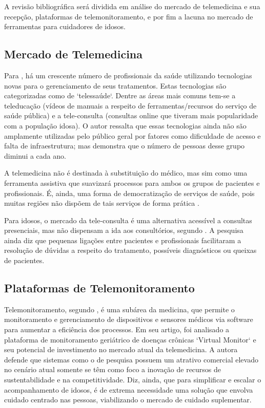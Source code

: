 \documentclass[
	article,			%
	12pt,				%
	oneside,			%
	a4paper,			%
    BIBLATEX,           %
	english,			%
	brazil,				%
	sumario=tradicional
	]{abntex2}
\begin{document}
A revisão bibliográfica será dividida em análise do mercado de telemedicina e sua recepção, plataformas de telemonitoramento, e por fim a lacuna no mercado de ferramentas para cuidadores de idosos.

\subsection{Mercado de Telemedicina}

Para , há um crescente número de profissionais da saúde utilizando tecnologias novas para o gerenciamento de seus tratamentos. Estas tecnologias são categorizadas como de `telessaúde`. Dentre as áreas mais comuns tem-se a teleducação (vídeos de manuais a respeito de ferramentas/recursos do serviço de saúde pública) e a tele-consulta (consultas online que tiveram mais popularidade com a população idosa). O autor ressalta que essas tecnologias ainda não são amplamente utilizadas pelo público geral por fatores como dificuldade de acesso e falta de infraestrutura; mas demonstra que o número de pessoas desse grupo diminui a cada ano.

A telemedicina não é destinada à substituição do médico, mas sim como uma ferramenta assistiva que suavizará processos para ambos os grupos de pacientes e profissionais. É, ainda, 
uma forma de democratização de serviços de saúde, pois muitas regiões não dispõem de tais serviços de forma prática \cite{Schaefer2023telemedicina}.

Para idosos, o mercado da tele-consulta é uma alternativa acessível a consultas presenciais, mas não dispensam a ida aos consultórios, segundo . A pesquisa ainda diz que pequenas ligações entre pacientes e profissionais facilitaram a resolução de dúvidas a respeito do tratamento, possíveis diagnósticos ou queixas de pacientes.

\subsection{Plataformas de Telemonitoramento}

Telemonitoramento, segundo , é uma subárea da medicina, que permite o monitoramento e gerenciamento de dispositivos e sensores médicos via software para aumentar a eficiência dos processos. Em seu artigo, foi analisado a plataforma de monitoramento geriátrico de doenças crônicas `Virtual Monitor` e seu potencial de investimento no mercado atual da telemedicina. A autora defende que sistemas como o de pesquisa possuem um atrativo comercial elevado no cenário atual somente se têm como foco a inovação de recursos de sustentabilidade e na competitividade. Diz, ainda, que para simplificar e escalar o acompanhamento de idosos, é de extrema necessidade uma solução que envolva cuidado centrado nas pessoas, viabilizando o mercado de cuidado suplementar.
\end{document}
